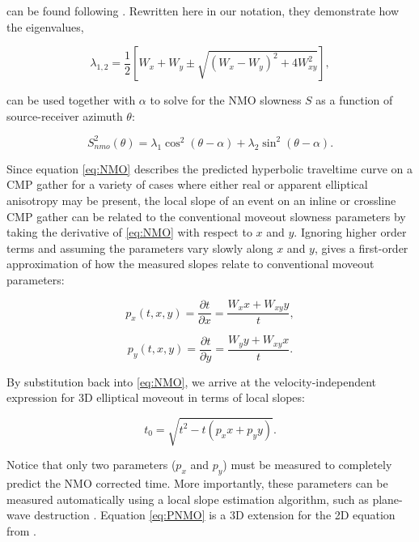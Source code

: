 \noindent can be found following \cite{GEO63-03-10791092}.  Rewritten here in our notation, they demonstrate how the eigenvalues, 


\begin{equation}
\label{eq:lambda}
\lambda _{1,2}=\frac{1}{2}\left[ W_x+W_y\pm \sqrt{(W_x-W_y)^2+4W_{xy}^2}\right],
\end{equation}


\noindent can be used together with $\alpha $ to solve for the NMO slowness $S$ as a function of source-receiver azimuth $\theta $:


\begin{equation}
\label{eq:S}
S_{nmo}^2(\theta )=\lambda _1\cos^2(\theta -\alpha )+\lambda _2\sin^2(\theta -\alpha).
\end{equation}


Since equation \ref{eq:NMO} describes the predicted hyperbolic traveltime curve on a CMP gather for a variety of cases where either real or apparent elliptical anisotropy may be present, the local slope of an event on an inline or crossline CMP gather can be related to the conventional moveout slowness parameters by taking the derivative of \ref{eq:NMO} with respect to $x$ and $y$.  Ignoring higher order terms and assuming the parameters vary slowly along $x$ and $y$, gives a first-order approximation of how the measured slopes relate to conventional moveout parameters:

\begin{equation}
\label{eq:px}
p_x(t,x,y)=\frac{\partial t}{\partial x}=\frac{W_xx+W_{xy}y}{t},
\end{equation}

\begin{equation}
\label{eq:py}
p_y(t,x,y)=\frac{\partial t}{\partial y}=\frac{W_yy+W_{xy}x}{t}.
\end{equation}

\noindent By substitution back into \ref{eq:NMO}, we arrive at the velocity-independent expression for 3D elliptical moveout in terms of local slopes:

\begin{equation}
\label{eq:PNMO}
t_0=\sqrt{t^2-t \left(p_xx+p_yy\right)}.
\end{equation}

\noindent Notice that only two parameters ($p_x$ and $p_y$) must be measured to completely predict the NMO corrected time.  More importantly, these parameters can be measured automatically using a local slope estimation algorithm, such as plane-wave destruction \cite[]{GEO67-06-19461960}. Equation \ref{eq:PNMO} is a 3D extension for the 2D equation from \cite{Ottolini.sep.37.59}.

